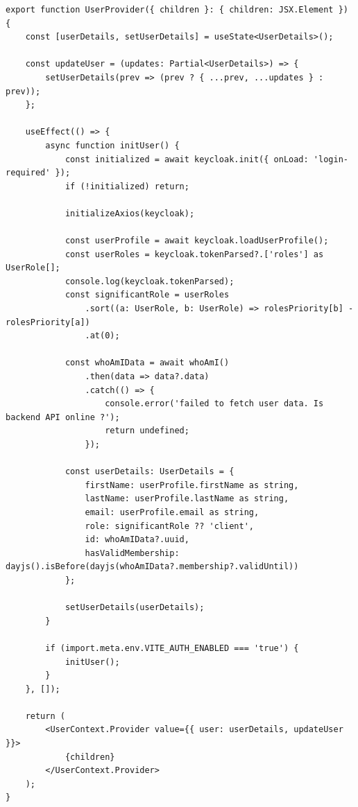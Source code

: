 \documentclass[../../spr.tex]{subfiles}
\begin{document}
\begin{lstlisting}[caption=Przykład globalnego stanu aplikacji. \textit{UserProvider} dostarcza innym komponentom kontekst użytkownika pobrany z serwisu \textit{Keycloak}.]
export function UserProvider({ children }: { children: JSX.Element }) {
    const [userDetails, setUserDetails] = useState<UserDetails>();

    const updateUser = (updates: Partial<UserDetails>) => {
        setUserDetails(prev => (prev ? { ...prev, ...updates } : prev));
    };

    useEffect(() => {
        async function initUser() {
            const initialized = await keycloak.init({ onLoad: 'login-required' });
            if (!initialized) return;

            initializeAxios(keycloak);

            const userProfile = await keycloak.loadUserProfile();
            const userRoles = keycloak.tokenParsed?.['roles'] as UserRole[];
            console.log(keycloak.tokenParsed);
            const significantRole = userRoles
                .sort((a: UserRole, b: UserRole) => rolesPriority[b] - rolesPriority[a])
                .at(0);

            const whoAmIData = await whoAmI()
                .then(data => data?.data)
                .catch(() => {
                    console.error('failed to fetch user data. Is backend API online ?');
                    return undefined;
                });

            const userDetails: UserDetails = {
                firstName: userProfile.firstName as string,
                lastName: userProfile.lastName as string,
                email: userProfile.email as string,
                role: significantRole ?? 'client',
                id: whoAmIData?.uuid,
                hasValidMembership: dayjs().isBefore(dayjs(whoAmIData?.membership?.validUntil))
            };

            setUserDetails(userDetails);
        }

        if (import.meta.env.VITE_AUTH_ENABLED === 'true') {
            initUser();
        }
    }, []);

    return (
        <UserContext.Provider value={{ user: userDetails, updateUser }}>
            {children}
        </UserContext.Provider>
    );
}
\end{lstlisting}
\end{document}
